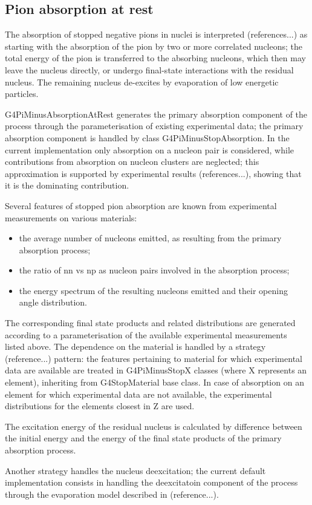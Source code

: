 \subsection {Pion absorption at rest}
The absorption of stopped negative pions in nuclei is interpreted 
(references...) as starting with the absorption of the pion by two or
more correlated nucleons; the total energy of the pion is transferred to
the absorbing nucleons, which then may leave the nucleus directly, or
undergo final-state interactions with the residual nucleus. The remaining
nucleus de-excites by evaporation of low energetic particles.

G4PiMinusAbsorptionAtRest generates the primary absorption component of 
the process through
the parameterisation of existing experimental data;
the primary absorption component is handled by class G4PiMinusStopAbsorption.
In the current implementation only absorption on a nucleon pair is considered,
while contributions from absorption on nucleon clusters are neglected; 
this approximation is supported by experimental 
results (references...), showing that it is the dominating contribution.

Several features of stopped pion absorption are known from experimental
measurements on various materials:
\begin{itemize}
\item the average number of nucleons emitted, as resulting from the
primary absorption process;
\item the ratio of nn vs np as nucleon pairs involved in the absorption
process;
\item the energy spectrum of the resulting nucleons emitted and their
opening angle distribution.
\end{itemize}
The corresponding final state products and related distributions are
generated according to a parameterisation
of the available experimental measurements listed above. The dependence on
the material is handled by a strategy (reference...) pattern:
the features pertaining to material for which experimental data are available 
are treated in G4PiMinusStopX classes (where X represents an element),
inheriting from G4StopMaterial base class. In case of absorption on an element
for which experimental data are not available, the experimental distributions
for the elements closest in Z are used. 

The excitation energy of the residual nucleus is calculated by difference
between the initial energy and the energy of the final state products of
the primary absorption process.

Another strategy handles the nucleus deexcitation; the current default
implementation consists in handling the deexcitatoin component of the process
through the evaporation model described in (reference...).



